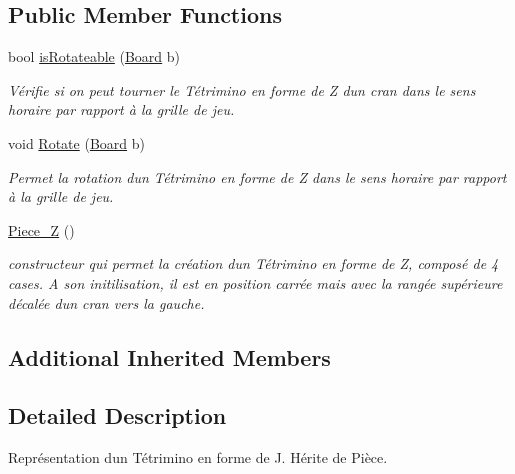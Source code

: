 \subsection*{Public Member Functions}
\begin{DoxyCompactItemize}
\item 
bool \hyperlink{classPiece__Z_aa70256d6f49dacad685a15c5ae8df06d}{is\+Rotateable} (\hyperlink{classBoard}{Board} b)
\begin{DoxyCompactList}\small\item\em Vérifie si on peut tourner le Tétrimino en forme de Z d\textquotesingle{}un cran dans le sens horaire par rapport à la grille de jeu. \end{DoxyCompactList}\item 
void \hyperlink{classPiece__Z_a50d6c34030c7641b4827353b9b82a68e}{Rotate} (\hyperlink{classBoard}{Board} b)
\begin{DoxyCompactList}\small\item\em Permet la rotation d\textquotesingle{}un Tétrimino en forme de Z dans le sens horaire par rapport à la grille de jeu. \end{DoxyCompactList}\item 
\mbox{\label{classPiece__Z_aecae5333fb48fae61d1b572b3282fc09}} 
\hyperlink{classPiece__Z_aecae5333fb48fae61d1b572b3282fc09}{Piece\+\_\+Z} ()
\begin{DoxyCompactList}\small\item\em constructeur qui permet la création d\textquotesingle{}un Tétrimino en forme de Z, composé de 4 cases. A son initilisation, il est en position carrée mais avec la rangée supérieure décalée d\textquotesingle{}un cran vers la gauche. \end{DoxyCompactList}\end{DoxyCompactItemize}
\subsection*{Additional Inherited Members}


\subsection{Detailed Description}
Représentation d\textquotesingle{}un Tétrimino en forme de J. Hérite de Pièce. 

